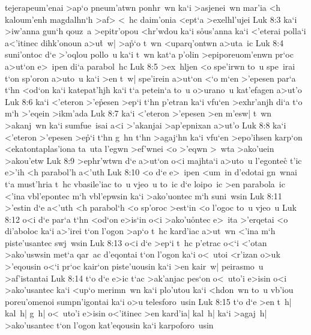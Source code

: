 tejerapeum'enai
>ap`o
pneum'atwn
ponhr~wn
ka`i
>asjenei~wn
mar'ia
<h
kaloum'enh
magdalhn`h
>af>
<~hc
daim'onia
<ept`a
>exelhl'ujei\bibvsend
\vs Luk 8:3
ka`i
>iw'anna
gun`h
qouz~a
>epitr'opou
<hr'wdou
ka`i
s\r{o}us'anna
ka`i
<'eterai
polla`i
a<'itinec
dihk'onoun
a>u\r{t}~w|
>a\r{p}`o
t~wn
<uparq'ontwn
a>uta~ic\bibvsend
\vs Luk 8:4
suni'ontoc
d`e
>'oqlou
pollo~u
ka`i
t~wn
kat`a
p'olin
>epiporeuom'enwn
pr`oc
a>ut`on
e>~ipen
di`a
parabol~hc\bibvsend
\vs Luk 8:5
>ex~hljen
<o
spe'irwn
to~u
spe~irai
t`on
sp'oron
a>uto~u
ka`i
>en
t~w|
spe'irein
a>ut`on
<`o
m`en
>'epesen
par`a
t`hn
<od`on
ka`i
katepat'hjh
ka`i
t`a
petein`a
to~u
o>urano~u
kat'efagen
a>ut'o\bibvsend
\vs Luk 8:6
ka`i
<'eteron
>'e\r{p}esen
>ep`i
t`hn
p'etran
ka`i
vfu`en
>exhr'anjh
di`a
t`o
m`h
>'eqein
>ikm'ada\bibvsend
\vs Luk 8:7
ka`i
<'eteron
>'epesen
>en
m'esw|
t~wn
>akanj~wn
ka`i
sumfue~isai
a<i
>'akanjai
>ap'epnixan
a>ut'o\bibvsend
\vs Luk 8:8
ka`i
<'eteron
>'epesen
>e\r{p}`i
t`hn
g~hn
t`hn
>agaj`hn
ka`i
vfu`en
>epo'ihsen
karp`on
<ekatontaplas'iona
ta~uta
l'egwn
>ef'wnei
<o
>'eqwn
>~wta
>ako'uein
>akou'etw\bibvsend
\vs Luk 8:9
>ephr'wtwn
d`e
a>ut`on
o<i
majhta`i
a>uto~u
l'egontec\r{}
t'ic
e>'ih
<h
parabol'h
a<'uth\bibvsend
\vs Luk 8:10
<o
d`e
e>~ipen
<um~in
d'edotai
gn~wnai
t`a
must'hria
t~hc
vbasile'iac
to~u
vjeo~u
to~ic
d`e
loipo~ic
>en
parabola~ic
<'ina
vbl'epontec
m`h
vbl'epwsin
ka`i
>ako'uontec
m`h
suni~wsin\bibvsend
\vs Luk 8:11
>'estin
d`e
a<'uth
<h
parabol`h
<o
sp'oroc
>est`in
<o
l'ogoc
to~u
vjeo~u\bibvsend
\vs Luk 8:12
o<i
d`e
par`a
t`hn
<od`on
e>is`in
o<i
>ako'u\r{o}ntec
e>~ita
>'erqetai
<o
di'aboloc
ka`i
a>'irei
t`on
l'ogon
>ap`o
t~hc
kard'iac
a>ut~wn
<'ina
m`h
piste'usantec
swj~wsin\bibvsend
\vs Luk 8:13
o<i
d`e
>ep`i
t~hc
p'etrac
o<`i
<'otan
>ako'uswsin
met`a
qar~ac
d'eqontai
t`on
l'ogon
ka`i
o<~utoi
<r'izan
o>uk
>'eqousin
o<`i
pr`oc
kair`on
piste'uousin
ka`i
>en
kair~w|
peirasmo~u
>af'istantai\bibvsend
\vs Luk 8:14
t`o
d`e
e>ic
t`ac
>ak'anjac
pes`on
o<~uto'i
e>isin
o<i
>ako'usantec
ka`i
<up`o
merimn~wn
ka`i
plo'utou
ka`i
<hdon~wn
to~u
vb'iou
poreu'omenoi
sumpn'igontai
ka`i
o>u
telesforo~usin\bibvsend
\vs Luk 8:15
t`o
d`e
>en
t~h|
kal~h|
g~h|
o<~uto'i
e>isin
o<'itinec
>en
kard'ia|
kal~h|
ka`i
>agaj~h|
>ako'usantec
t`on
l'ogon
kat'eqousin
ka`i
karpoforo~usin
